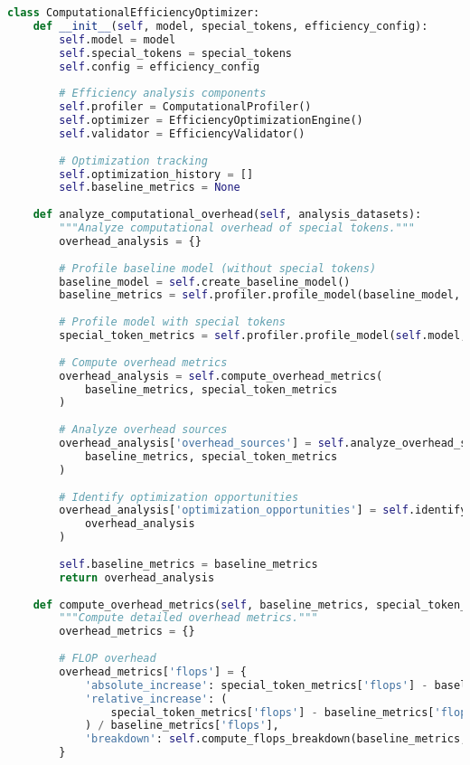 \begin{lstlisting}[language=Python, caption=Comprehensive computational efficiency optimization framework]
class ComputationalEfficiencyOptimizer:
    def __init__(self, model, special_tokens, efficiency_config):
        self.model = model
        self.special_tokens = special_tokens
        self.config = efficiency_config
        
        # Efficiency analysis components
        self.profiler = ComputationalProfiler()
        self.optimizer = EfficiencyOptimizationEngine()
        self.validator = EfficiencyValidator()
        
        # Optimization tracking
        self.optimization_history = []
        self.baseline_metrics = None
        
    def analyze_computational_overhead(self, analysis_datasets):
        """Analyze computational overhead of special tokens."""
        overhead_analysis = {}
        
        # Profile baseline model (without special tokens)
        baseline_model = self.create_baseline_model()
        baseline_metrics = self.profiler.profile_model(baseline_model, analysis_datasets)
        
        # Profile model with special tokens
        special_token_metrics = self.profiler.profile_model(self.model, analysis_datasets)
        
        # Compute overhead metrics
        overhead_analysis = self.compute_overhead_metrics(
            baseline_metrics, special_token_metrics
        )
        
        # Analyze overhead sources
        overhead_analysis['overhead_sources'] = self.analyze_overhead_sources(
            baseline_metrics, special_token_metrics
        )
        
        # Identify optimization opportunities
        overhead_analysis['optimization_opportunities'] = self.identify_efficiency_opportunities(
            overhead_analysis
        )
        
        self.baseline_metrics = baseline_metrics
        return overhead_analysis
    
    def compute_overhead_metrics(self, baseline_metrics, special_token_metrics):
        """Compute detailed overhead metrics."""
        overhead_metrics = {}
        
        # FLOP overhead
        overhead_metrics['flops'] = {
            'absolute_increase': special_token_metrics['flops'] - baseline_metrics['flops'],
            'relative_increase': (
                special_token_metrics['flops'] - baseline_metrics['flops']
            ) / baseline_metrics['flops'],
            'breakdown': self.compute_flops_breakdown(baseline_metrics, special_token_metrics)
        }
        

\end{lstlisting}
